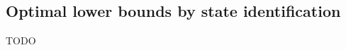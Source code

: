\documentclass[main.tex]{subfiles}
\begin{document}
\subsection{Optimal lower bounds by state identification}

TODO

%
%
%
%	
%
%
%
\end{document}
